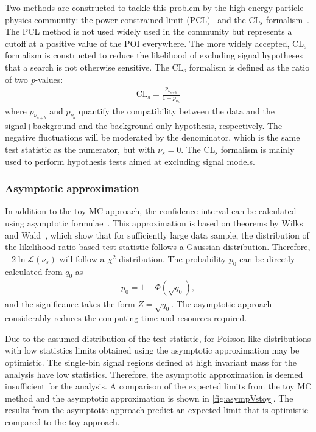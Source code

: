 Two methods are constructed to tackle this problem by the high-energy particle physics community: the power-constrained limit (PCL)~\cite{PhysRevLett.122.231801} and the $\mathrm{CL}_\mathrm{s}$ formalism~\cite{JUNK1999435,Read_2002}. The PCL method is not used widely used in the community but represents a cutoff at a positive value of the POI everywhere. The more widely accepted, $\mathrm{CL}_\mathrm{s}$ formalism is constructed to reduce the likelihood of excluding signal hypotheses that a search is not otherwise sensitive. The $\mathrm{CL}_\mathrm{s}$ formalism is defined as the ratio of two \emph{p}-values:
\begin{equation}
    \label{eq:cls}
    \begin{aligned}
        \mathrm{CL}_\mathrm{s} = \frac{p_{\nu_{s+b}}}{1-p_{\nu_{b}}}
    \end{aligned}
\end{equation}
where $p_{\nu_{s+b}}$ and $p_{\nu_{b}}$ quantify the compatibility between the data and the signal+background and the background-only hypothesis, respectively. The negative fluctuations will be moderated by the denominator, which is the same test statistic as the numerator, but with $\nu_s = 0$. The $\mathrm{CL}_\mathrm{s}$ formalism is mainly used to perform hypothesis tests aimed at excluding signal models. 

\subsubsection{Asymptotic approximation}
In addition to the toy MC approach, the confidence interval can be calculated using asymptotic formulae~\cite{Cowan:2010js}. This approximation is based on theorems by Wilks and Wald~\cite{wilks1938}, which show that for sufficiently large data sample, the distribution of the likelihood-ratio based test statistic follows a Gaussian distribution. Therefore, $-2\ln\mathcal{L}(\nu_s)$ will follow a $\chi^2$ distribution. The probability $p_0$ can be directly calculated from $q_0$ as~\cite{Cowan:2010js}
\begin{equation}
    \label{eq:p0_asymp}
    \begin{aligned}
        p_0 = 1 - \Phi\left(\sqrt{q_0}\right),
    \end{aligned}
\end{equation}
and the significance takes the form $Z = \sqrt{q_0}$. The asymptotic approach considerably reduces the computing time and resources required. 

Due to the assumed distribution of the test statistic, for Poisson-like distributions with low statistics limits obtained using the asymptotic approximation may be optimistic. The single-bin signal regions defined at high invariant mass for the analysis have low statistics. Therefore, the asymptotic approximation is deemed insufficient for the analysis. A comparison of the expected limits from the toy MC method and the asymptotic approximation is shown in \cref{fig:asympVstoy}. The results from the asymptotic approach predict an expected limit that is optimistic compared to the toy approach. 

